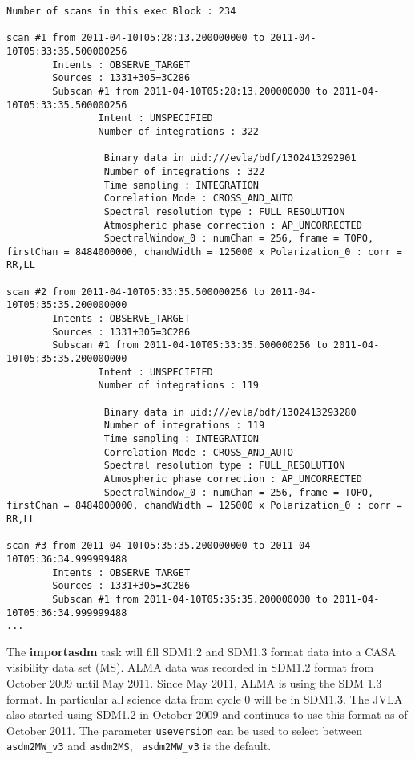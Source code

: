 \begin{verbatim}
Number of scans in this exec Block : 234

scan #1 from 2011-04-10T05:28:13.200000000 to 2011-04-10T05:33:35.500000256
        Intents : OBSERVE_TARGET
        Sources : 1331+305=3C286
        Subscan #1 from 2011-04-10T05:28:13.200000000 to 2011-04-10T05:33:35.500000256
                Intent : UNSPECIFIED
                Number of integrations : 322

                 Binary data in uid:///evla/bdf/1302413292901
                 Number of integrations : 322
                 Time sampling : INTEGRATION
                 Correlation Mode : CROSS_AND_AUTO
                 Spectral resolution type : FULL_RESOLUTION
                 Atmospheric phase correction : AP_UNCORRECTED
                 SpectralWindow_0 : numChan = 256, frame = TOPO, firstChan = 8484000000, chandWidth = 125000 x Polarization_0 : corr = RR,LL

scan #2 from 2011-04-10T05:33:35.500000256 to 2011-04-10T05:35:35.200000000
        Intents : OBSERVE_TARGET
        Sources : 1331+305=3C286
        Subscan #1 from 2011-04-10T05:33:35.500000256 to 2011-04-10T05:35:35.200000000
                Intent : UNSPECIFIED
                Number of integrations : 119

                 Binary data in uid:///evla/bdf/1302413293280
                 Number of integrations : 119
                 Time sampling : INTEGRATION
                 Correlation Mode : CROSS_AND_AUTO
                 Spectral resolution type : FULL_RESOLUTION
                 Atmospheric phase correction : AP_UNCORRECTED
                 SpectralWindow_0 : numChan = 256, frame = TOPO, firstChan = 8484000000, chandWidth = 125000 x Polarization_0 : corr = RR,LL

scan #3 from 2011-04-10T05:35:35.200000000 to 2011-04-10T05:36:34.999999488
        Intents : OBSERVE_TARGET
        Sources : 1331+305=3C286
        Subscan #1 from 2011-04-10T05:35:35.200000000 to 2011-04-10T05:36:34.999999488
...
\end{verbatim}
\normalsize

The {\bf importasdm} task will fill SDM1.2 and SDM1.3 format data into
a CASA visibility data set (MS). ALMA data was recorded in SDM1.2
format from October 2009 until May 2011. Since May 2011, ALMA is using
the SDM 1.3 format. In particular all science data from cycle 0 will
be in SDM1.3. The JVLA also started using SDM1.2 in October 2009 and
continues to use this format as of October 2011. The parameter {\tt useversion} can
be used to select between {\tt asdm2MW\_v3} and {\tt asdm2MS}, {\tt
  asdm2MW\_v3} is the default.




